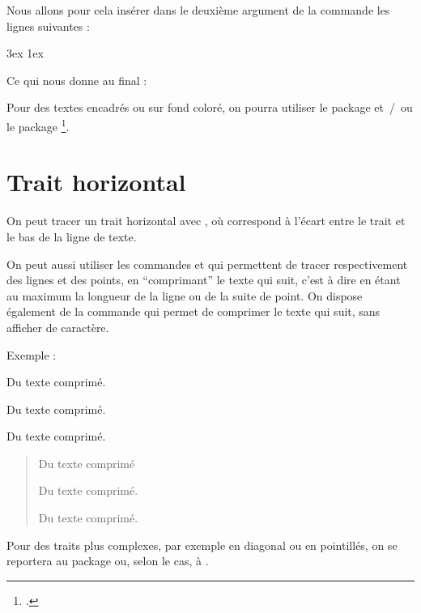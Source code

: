 Nous allons pour cela insérer dans le deuxième argument de la commande  les lignes suivantes :

\begin{latexcode}
\leftmargin 3ex
\rightmargin 1ex
\itshape
\end{latexcode}

Ce qui nous donne au final :

\begin{latexcode}
\makeatletter
\newenvironment{exemple}
               {\list{}{\listparindent 1.5em%
                        \itemindent    \listparindent
                        \leftmargin 3ex
            \rightmargin 1ex
            \itshape
                        \parsep        \z@ \@plus\p@}%
                \item\relax}
               {\endlist}
\makeatother
\end{latexcode}

\begin{plusloins}
Pour des textes encadrés ou sur fond coloré, on pourra utiliser le package  et~/~ou le package \footcites[On peut également consulter][qui regorge d'exemple pratique de \enquote{mise en boîte}]{frama}[on consultera en particulier][]{frama_boites}. 
\end{plusloins}

\section{Trait horizontal}\label{filets}

On peut tracer un trait horizontal avec  , où  correspond à l'écart entre le trait et le bas de la ligne de texte.

On peut aussi utiliser les commandes  et  qui permettent de tracer respectivement des lignes et des points, en \enquote{comprimant} le texte qui suit, c'est à dire en étant au maximum la longueur de la ligne ou de la suite de point. On dispose également de la commande \label{hfill} qui permet de comprimer le texte qui suit, sans afficher de caractère.

Exemple :

\begin{latexcode}
\hfill Du texte comprimé.

\hrulefill Du texte comprimé.

\dotfill Du texte comprimé.
\end{latexcode}

\begin{quotation}
\hfill Du texte comprimé

\hrulefill Du texte comprimé.

\dotfill Du texte comprimé.
\end{quotation}

Pour des traits plus complexes, par exemple en diagonal ou en pointillés, on se reportera au package  ou, selon le cas, à . 



